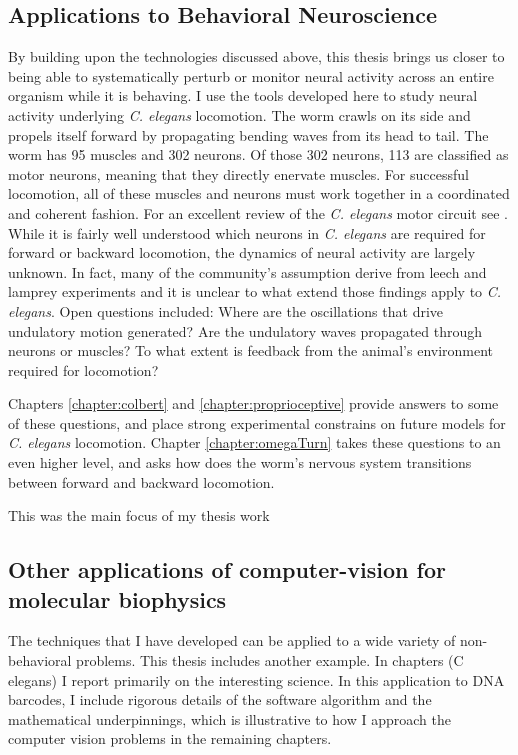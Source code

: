 \subsection{Applications to Behavioral Neuroscience}

By building upon the technologies discussed above, 
this thesis brings us closer to being able to systematically perturb or monitor neural activity across an entire organism while it is behaving. I use the tools developed here to study  neural activity underlying \emph{C. elegans} locomotion. The worm crawls on its side and propels itself forward by propagating bending waves from its head to tail.  The worm has 95 muscles and 302 neurons. Of those 302 neurons, 113 are classified as motor neurons, meaning that they directly enervate muscles. For successful locomotion, all of these muscles and neurons must work together in a coordinated and coherent fashion. For an excellent review of the \textit{C. elegans}  motor circuit see \citep{von_stetina_motor_2006}. While it is fairly well understood which neurons  in \textit{C. elegans} are required for forward or backward locomotion, the dynamics of neural activity are largely unknown. In fact, many of the community's assumption derive from leech and lamprey experiments \citep{friesen_sensory_2001, karbowski_systems_2008} and it is unclear to what extend those findings apply to \textit{C. elegans}. Open questions included: Where are the oscillations that drive undulatory motion generated? Are the undulatory waves propagated through neurons or muscles? To what extent is  feedback from the animal's environment required for locomotion? 

Chapters \ref{chapter:colbert} and \ref{chapter:proprioceptive} provide answers to some of these questions, and place strong experimental constrains on future models for \textit{C. elegans} locomotion.  Chapter \ref{chapter:omegaTurn} takes these questions to an even higher level, and asks how does the worm's nervous system transitions between forward and backward locomotion. 





This was the main focus of my thesis work

\subsection{Other applications of computer-vision for molecular biophysics}
The techniques that I have developed  can be applied to a wide variety of non-behavioral problems. This thesis includes another example. In chapters (C elegans) I report primarily on the interesting science. In this application to DNA barcodes, I include rigorous details of the software algorithm and the mathematical underpinnings, which is illustrative to how I approach the computer vision problems in the remaining chapters. 

